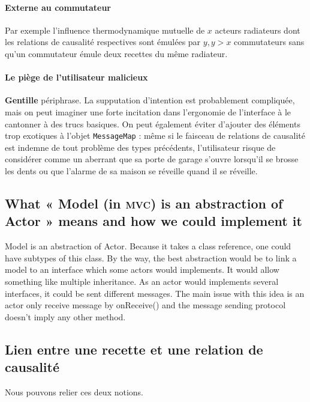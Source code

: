 \documentclass[11pt]{article}
\begin{document}
\paragraph{Externe au commutateur} Par exemple l'influence thermodynamique mutuelle de $x$ acteurs radiateurs dont les relations de causalité respectives sont émulées par $y, y > x$ commutateurs sans qu'un commutateur émule deux recettes du même radiateur.

\paragraph{Le piège de l'utilisateur malicieux} \textbf{Gentille} périphrase. La supputation d'intention est probablement compliquée, mais on peut imaginer une forte incitation dans l'ergonomie de l'interface à le cantonner à des trucs basiques. On peut également éviter d'ajouter des éléments trop exotiques à l'objet \texttt{MessageMap} : même si le faisceau de relations de causalité est indemne de tout problème des types précédents, l'utilisateur risque de considérer comme un aberrant que sa porte de garage s'ouvre lorsqu'il se brosse les dents ou que l'alarme de sa maison se réveille quand il se réveille.


\subsection{What « Model (in \textsc{mvc}) is an abstraction of Actor » means and how we could implement it}

Model is an abstraction of Actor. Because it takes a class reference, one could have subtypes of this class. By the way, the best abstraction would be to link a model to an interface which some actors would implements. It would allow something like multiple inheritance. As an actor would implements several interfaces, it could be sent different messages. The main issue with this idea is an actor only receive message by onReceive() and the message sending protocol doesn't imply any other method.


\subsection{Lien entre une recette et une relation de causalité}

Nous pouvons relier ces deux notions.
\end{document}

